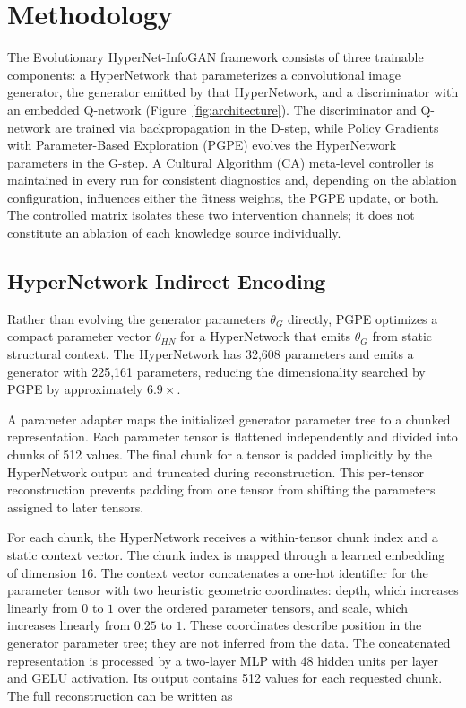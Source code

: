 \section{Methodology}
\label{sec:methodology}

The Evolutionary HyperNet-InfoGAN framework consists of three trainable components: a HyperNetwork that parameterizes a convolutional image generator, the generator emitted by that HyperNetwork, and a discriminator with an embedded Q-network (Figure~\ref{fig:architecture}). The discriminator and Q-network are trained via backpropagation in the D-step, while Policy Gradients with Parameter-Based Exploration (PGPE) evolves the HyperNetwork parameters in the G-step. A Cultural Algorithm (CA) meta-level controller is maintained in every run for consistent diagnostics and, depending on the ablation configuration, influences either the fitness weights, the PGPE update, or both. The controlled matrix isolates these two intervention channels; it does not constitute an ablation of each knowledge source individually.

\subsection{HyperNetwork Indirect Encoding}

Rather than evolving the generator parameters $\theta_G$ directly, PGPE optimizes a compact parameter vector $\theta_{HN}$ for a HyperNetwork that emits $\theta_G$ from static structural context. The HyperNetwork has 32,608 parameters and emits a generator with 225,161 parameters, reducing the dimensionality searched by PGPE by approximately $6.9\times$.

A parameter adapter maps the initialized generator parameter tree to a chunked representation. Each parameter tensor is flattened independently and divided into chunks of 512 values. The final chunk for a tensor is padded implicitly by the HyperNetwork output and truncated during reconstruction. This per-tensor reconstruction prevents padding from one tensor from shifting the parameters assigned to later tensors.

For each chunk, the HyperNetwork receives a within-tensor chunk index and a static context vector. The chunk index is mapped through a learned embedding of dimension 16. The context vector concatenates a one-hot identifier for the parameter tensor with two heuristic geometric coordinates: depth, which increases linearly from $0$ to $1$ over the ordered parameter tensors, and scale, which increases linearly from $0.25$ to $1$. These coordinates describe position in the generator parameter tree; they are not inferred from the data. The concatenated representation is processed by a two-layer MLP with 48 hidden units per layer and GELU activation. Its output contains 512 values for each requested chunk. The full reconstruction can be written as

